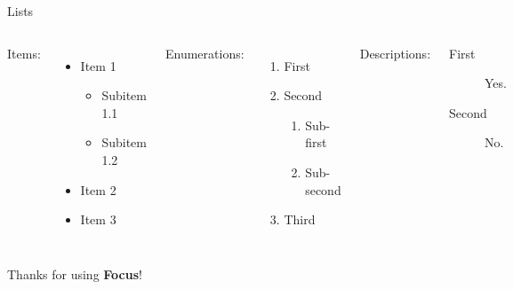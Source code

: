\documentclass{beamer}
\begin{document}
\begin{frame}{Lists}
    \begin{columns}[T, onlytextwidth] %
            Items:
            \begin{itemize}
                \item Item 1
                \begin{itemize}
                    \item Subitem 1.1
                    \item Subitem 1.2
                \end{itemize}
                \item Item 2
                \item Item 3
            \end{itemize}

            Enumerations:
            \begin{enumerate}
                \item First
                \item Second
                \begin{enumerate}
                    \item Sub-first
                    \item Sub-second
                \end{enumerate}
                \item Third
            \end{enumerate}

            Descriptions:
            \begin{description}
                \item[First] Yes.
                \item[Second] No.
            \end{description}
    \end{columns}
\end{frame}


\begin{frame}[focus]
    Thanks for using \textbf{Focus}!
\end{frame}

\end{document}
